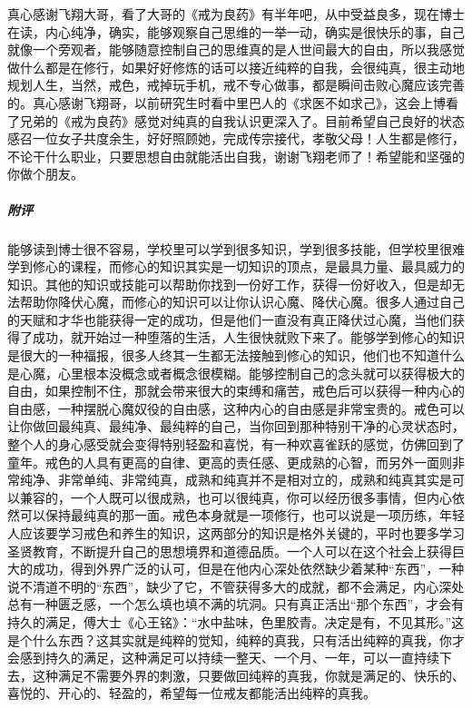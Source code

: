 \begin{case}
    真心感谢飞翔大哥，看了大哥的《戒为良药》有半年吧，从中受益良多，现在博士在读，内心纯净，确实，能够观察自己思维的一举一动，确实是很快乐的事，自己就像一个旁观者，能够随意控制自己的思维真的是人世间最大的自由，所以我感觉做什么都是在修行，如果好好修炼的话可以接近纯粹的自我，会很纯真，很主动地规划人生，当然，戒色，戒掉玩手机，戒不专心做事，都是瞬间击败心魔应该完善的。真心感谢飞翔哥，以前研究生时看中里巴人的《求医不如求己》，这会上博看了兄弟的《戒为良药》感觉对纯真的自我认识更深入了。目前希望自己良好的状态感召一位女子共度余生，好好照顾她，完成传宗接代，孝敬父母！人生都是修行，不论干什么职业，只要思想自由就能活出自我，谢谢飞翔老师了！希望能和坚强的你做个朋友。
    \subparagraph{附评} 能够读到博士很不容易，学校里可以学到很多知识，学到很多技能，但学校里很难学到修心的课程，而修心的知识其实是一切知识的顶点，是最具力量、最具威力的知识。其他的知识或技能可以帮助你找到一份好工作，获得一份好收入，但是却无法帮助你降伏心魔，而修心的知识可以让你认识心魔、降伏心魔。很多人通过自己的天赋和才华也能获得一定的成功，但是他们一直没有真正降伏过心魔，当他们获得了成功，就开始过一种堕落的生活，人生很快就败下来了。能够学到修心的知识是很大的一种福报，很多人终其一生都无法接触到修心的知识，他们也不知道什么是心魔，心里根本没概念或者概念很模糊。能够控制自己的念头就可以获得极大的自由，如果控制不住，那就会带来很大的束缚和痛苦，戒色后可以获得一种内心的自由感，一种摆脱心魔奴役的自由感，这种内心的自由感是非常宝贵的。戒色可以让你做回最纯真、最纯净、最纯粹的自己，当你回到那种特别干净的心灵状态时，整个人的身心感受就会变得特别轻盈和喜悦，有一种欢喜雀跃的感觉，仿佛回到了童年。戒色的人具有更高的自律、更高的责任感、更成熟的心智，而另外一面则非常纯净、非常单纯、非常纯真，成熟和纯真并不是相对立的，成熟和纯真其实是可以兼容的，一个人既可以很成熟，也可以很纯真，你可以经历很多事情，但内心依然可以保持最纯真的那一面。戒色本身就是一项修行，也可以说是一项历练，年轻人应该要学习戒色和养生的知识，这两部分的知识是格外关键的，平时也要多学习圣贤教育，不断提升自己的思想境界和道德品质。一个人可以在这个社会上获得巨大的成功，得到外界广泛的认可，但是在他内心深处依然缺少着某种“东西”，一种说不清道不明的“东西”，缺少了它，不管获得多大的成就，都不会满足，内心深处总有一种匮乏感，一个怎么填也填不满的坑洞。只有真正活出“那个东西”，才会有持久的满足，傅大士《心王铭》：“水中盐味，色里胶青。决定是有，不见其形。”这是个什么东西？这其实就是纯粹的觉知，纯粹的真我，只有活出纯粹的真我，你才会感到持久的满足，这种满足可以持续一整天、一个月、一年，可以一直持续下去，这种满足不需要外界的刺激，只要做回纯粹的真我，你就是满足的、快乐的、喜悦的、开心的、轻盈的，希望每一位戒友都能活出纯粹的真我。
\end{case}

